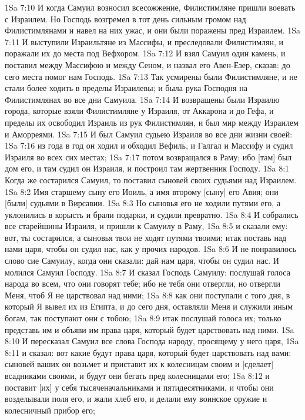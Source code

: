 1Sa 7:10  И когда Самуил возносил всесожжение, Филистимляне пришли воевать с Израилем. Но Господь возгремел в тот день сильным громом над Филистимлянами и навел на них ужас, и они были поражены пред Израилем.
1Sa 7:11  И выступили Израильтяне из Массифы, и преследовали Филистимлян, и поражали их до места под Вефхором.
1Sa 7:12  И взял Самуил один камень, и поставил между Массифою и между Сеном, и назвал его Авен-Езер, сказав: до сего места помог нам Господь.
1Sa 7:13  Так усмирены были Филистимляне, и не стали более ходить в пределы Израилевы; и была рука Господня на Филистимлянах во все дни Самуила.
1Sa 7:14  И возвращены были Израилю города, которые взяли Филистимляне у Израиля, от Аккарона и до Гефа, и пределы их освободил Израиль из рук Филистимлян, и был мир между Израилем и Аморреями.
1Sa 7:15  И был Самуил судьею Израиля во все дни жизни своей:
1Sa 7:16  из года в год он ходил и обходил Вефиль, и Галгал и Массифу и судил Израиля во всех сих местах;
1Sa 7:17  потом возвращался в Раму; ибо [там] был дом его, и там судил он Израиля, и построил там жертвенник Господу.
1Sa 8:1  Когда же состарился Самуил, то поставил сыновей своих судьями над Израилем.
1Sa 8:2  Имя старшему сыну его Иоиль, а имя второму [сыну] его Авия; они [были] судьями в Вирсавии.
1Sa 8:3  Но сыновья его не ходили путями его, а уклонились в корысть и брали подарки, и судили превратно.
1Sa 8:4  И собрались все старейшины Израиля, и пришли к Самуилу в Раму,
1Sa 8:5  и сказали ему: вот, ты состарился, а сыновья твои не ходят путями твоими; итак поставь над нами царя, чтобы он судил нас, как у прочих народов.
1Sa 8:6  И не понравилось слово сие Самуилу, когда они сказали: дай нам царя, чтобы он судил нас. И молился Самуил Господу.
1Sa 8:7  И сказал Господь Самуилу: послушай голоса народа во всем, что они говорят тебе; ибо не тебя они отвергли, но отвергли Меня, чтоб Я не царствовал над ними;
1Sa 8:8  как они поступали с того дня, в который Я вывел их из Египта, и до сего дня, оставляли Меня и служили иным богам, так поступают они с тобою;
1Sa 8:9  итак послушай голоса их; только представь им и объяви им права царя, который будет царствовать над ними.
1Sa 8:10  И пересказал Самуил все слова Господа народу, просящему у него царя,
1Sa 8:11  и сказал: вот какие будут права царя, который будет царствовать над вами: сыновей ваших он возьмет и приставит их к колесницам своим и [сделает] всадниками своими, и будут они бегать пред колесницами его;
1Sa 8:12  и поставит [их] у себя тысяченачальниками и пятидесятниками, и чтобы они возделывали поля его, и жали хлеб его, и делали ему воинское оружие и колесничный прибор его;
